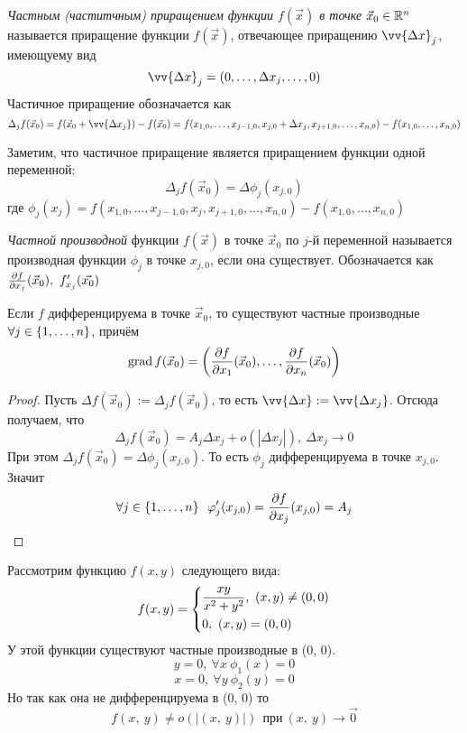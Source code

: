 \begin{definition}
	\textit{Частным (частитчным) приращением функции $f(\vec{x})$ в точке} $\vec{x}_0 \in \mathbb{R}^n$ называется приращение функции $f(\vec{x})$, отвечающее 	приращению $\vv{\Delta x}_j$, имеющуему вид
	\[
		\vv{\Delta x}_j = (0, \ldots, \Delta x_j, \ldots, 0)
	\]
	Частичное приращение обозначается как
	\[
		\Delta_j f(\vec{x}_0) = f(\vec{x}_0 + \vv{\Delta x_j}) - f(\vec{x}_0) = f(x_{1, 0}, \ldots, x_{j - 1, 0}, x_{j, 0} + \Delta x_j, x_{j + 1, 0}, \ldots, x_{n, 0}) - f(x_{1, 0}, \ldots, x_{n, 0})
	\]
\end{definition}

\begin{note}
	Заметим, что частичное приращение является приращением функции одной переменной:
	\[
		\Delta_j f(\vec{x}_0) = \Delta \phi_j (x_{j, 0})
	\]
	где $\phi_j(x_j) = f(x_{1, 0}, \ldots, x_{j - 1, 0}, x_j, x_{j + 1, 0}, \ldots, x_{n, 0}) - f(x_{1, 0}, \ldots, x_{n, 0})$
\end{note}

\begin{definition}
	\textit{Частной производной} функции $f(\vec{x})$ в точке $\vec{x}_0$ по $j$-й переменной называется производная функции $\phi_j$ в точке $x_{j, 0}$, если она существует. Обозначается как $\frac{\vdelta f}{\vdelta x_j}(\vec{x}_0),\ f'_{x_j}(\vec{x_0})$
\end{definition}

\begin{theorem}
	Если $f$ дифференцируема в точке $\vec{x}_0$, то существуют частные производные $\forall j \in \{1, \ldots, n\}$, причём
	\[
		\operatorname{grad} f(\vec{x}_0) = \left(\frac{\partial f}{\partial x_1}(\vec{x}_0), \ldots, \frac{\partial f}{\partial x_n}(\vec{x}_0)\right)
	\]
\end{theorem}

\begin{proof}
	Пусть $\Delta f(\vec{x}_0) := \Delta_j f(\vec{x}_0)$, то есть $\vv{\Delta x} := \vv{\Delta x_j}$. Отсюда получаем, что
	\[
		\Delta_j f(\vec{x}_0) = A_j \Delta x_j + o(|\Delta x_j|),\ \Delta x_j \to 0
	\]
	При этом $\Delta_j f(\vec{x}_0) = \Delta \phi_j (x_{j, 0})$. То есть $\phi_j$ дифференцируема в точке $x_{j, 0}$. Значит
	\[
		\forall j \in \{1, \ldots, n\}\ \ \varphi'_j (x_{j, 0}) = \frac{\partial f}{\partial x_j} (x_{j, 0}) = A_j
	\]
\end{proof}

\begin{example}
	Рассмотрим функцию $f(x, y)$ следующего вида:
	\[
		f(x, y) = \left\{\begin{aligned}
			&{\frac{xy}{x^2 + y^2},\ (x, y) \neq (0, 0)}
			\\
			&{0,\ (x, y) = (0, 0)}
		\end{aligned}\right.
	\]
	У этой функции существуют частные производные в (0, 0).
	\[
		y = 0,\ \forall x \  \phi_1(x) = 0 
	\]
	\[
		x = 0,\ \forall y \ \phi_2(y) = 0
	\]
	Но так как она не дифференцируема в (0, 0) то
	\[
		f(x,\ y) \neq o(|(x,\ y)|) \ \ \text{при} \  (x,\ y) \to \vec{0}
	\]
\end{example}

